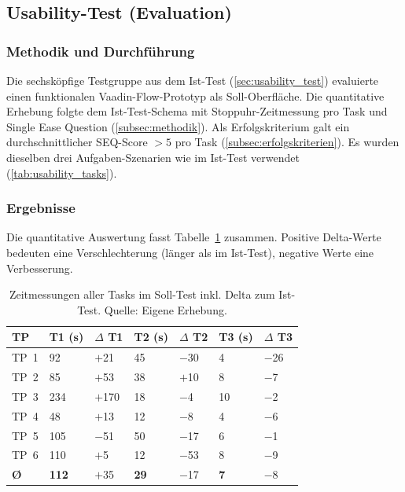 \subsection{Usability-Test (Evaluation)}\label{sec:usability_test_evaluation}

\subsubsection{Methodik und Durchführung}

Die sechsköpfige Testgruppe aus dem Ist-Test (\autoref{sec:usability_test}) evaluierte einen funktionalen Vaadin-Flow-Prototyp als Soll-Oberfläche. Die quantitative Erhebung folgte dem Ist-Test-Schema mit Stoppuhr-Zeitmessung pro Task und Single Ease Question (\autoref{subsec:methodik}). Als Erfolgskriterium galt ein durchschnittlicher SEQ-Score $> 5$ pro Task (\autoref{subsec:erfolgskriterien}). Es wurden dieselben drei Aufgaben-Szenarien wie im Ist-Test verwendet (\autoref{tab:usability_tasks}).

\subsubsection{Ergebnisse}

Die quantitative Auswertung fasst Tabelle~\ref{tab:zeit_kombiniert_soll} zusammen. Positive Delta-Werte bedeuten eine Verschlechterung (länger als im Ist-Test), negative Werte eine Verbesserung.

\begin{table}[H]
  \centering
  \scriptsize
  \begin{tabular}{p{0.7cm}p{0.95cm}p{0.75cm}p{0.95cm}p{0.75cm}p{0.85cm}p{0.75cm}}
    \toprule
    \textbf{TP} & \textbf{T1 (s)} & \textbf{$\Delta$ T1} & \textbf{T2 (s)} & \textbf{$\Delta$ T2} & \textbf{T3 (s)} & \textbf{$\Delta$ T3} \\
    \midrule
    TP~1  &   92 & $+$21   &   45 & $-$30 &    4 & $-$26 \\
    TP~2  &   85 & $+$53   &   38 & $+$10 &    8 & $-$\phantom{0}7 \\
    TP~3  &  234 & $+$170  &   18 & $-$\phantom{0}4 &   10 & $-$\phantom{0}2 \\
    TP~4  &   48 & $+$13   &   12 & $-$\phantom{0}8 &    4 & $-$\phantom{0}6 \\
    TP~5  &  105 & $-$51   &   50 & $-$17 &    6 & $-$\phantom{0}1 \\
    TP~6  &   110 & $+$\phantom{0}5 &   12 & $-$53 &    8 & $-$\phantom{0}9 \\
    \midrule
    \textbf{Ø} & \textbf{112} & $+$35 & \textbf{29} & $-$17 & \textbf{7} & $-$\phantom{0}8 \\
    \bottomrule
  \end{tabular}
  \caption[Zeitmessungen Soll-Test pro Testperson mit Delta zum Ist]{Zeitmessungen aller Tasks im Soll-Test inkl. Delta zum Ist-Test. Quelle: Eigene Erhebung.}
  \label{tab:zeit_kombiniert_soll}
\end{table}

